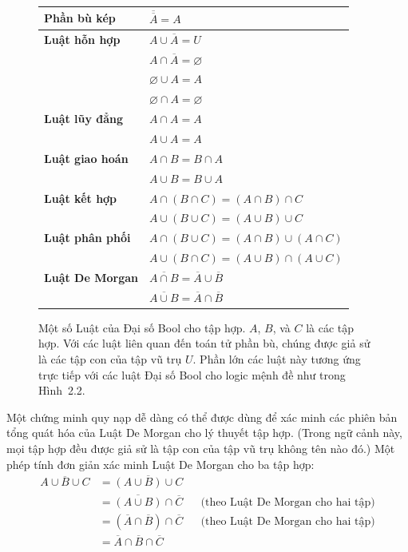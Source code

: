 \begin{figure}[ht]
\centering
\begin{tabular}{ll}
\toprule
\textbf{Phần bù kép} & $\overline{\overline{A}} = A$ \\
\midrule
\textbf{Luật hỗn hợp} & $A \cup \overline{A} = U$ \\
& $A \cap \overline{A} = \varnothing$ \\
& $\varnothing \cup A = A$ \\
& $\varnothing \cap A = \varnothing$ \\
\midrule
\textbf{Luật lũy đẳng} & $A \cap A = A$ \\
& $A \cup A = A$ \\
\midrule
\textbf{Luật giao hoán} & $A \cap B = B \cap A$ \\
& $A \cup B = B \cup A$ \\
\midrule
\textbf{Luật kết hợp} & $A \cap (B \cap C) = (A \cap B) \cap C$ \\
& $A \cup (B \cup C) = (A \cup B) \cup C$ \\
\midrule
\textbf{Luật phân phối} & $A \cap (B \cup C) = (A \cap B) \cup (A \cap C)$ \\
& $A \cup (B \cap C) = (A \cup B) \cap (A \cup C)$ \\
\midrule
\textbf{Luật De Morgan} & $\overline{A \cap B} = \overline{A} \cup \overline{B}$ \\
& $\overline{A \cup B} = \overline{A} \cap \overline{B}$ \\
\bottomrule
\end{tabular}
\caption{Một số Luật của Đại số Bool cho tập hợp. $A$, $B$, và $C$ là các tập hợp. Với các luật liên quan đến toán tử phần bù, chúng được giả sử là các tập con của tập vũ trụ $U$. Phần lớn các luật này tương ứng trực tiếp với các luật Đại số Bool cho logic mệnh đề như trong Hình~2.2.}
\label{fig:4.4}
\end{figure}

Một chứng minh quy nạp dễ dàng có thể được dùng để xác minh các phiên bản tổng quát hóa của Luật De Morgan cho lý thuyết tập hợp. (Trong ngữ cảnh này, mọi tập hợp đều được giả sử là tập con của tập vũ trụ không tên nào đó.) Một phép tính đơn giản xác minh Luật De Morgan cho ba tập hợp:
\begin{align*}
\overline{A \cup B \cup C} &= \overline{(A \cup B) \cup C} \\
&= \overline{(A \cup B)} \cap \overline{C} & &\text{(theo Luật De Morgan cho hai tập)} \\
&= (\overline{A} \cap \overline{B}) \cap \overline{C} & &\text{(theo Luật De Morgan cho hai tập)} \\
&= \overline{A} \cap \overline{B} \cap \overline{C}
\end{align*}

